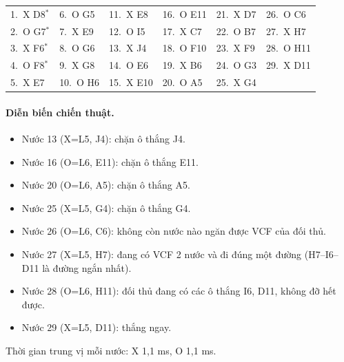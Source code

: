 {\footnotesize\linespread{1}\selectfont
\noindent\begin{tabularx}{\linewidth}{*{6}{X}}
\toprule
1.~X D8$^\ast$ & 6.~O G5 & 11.~X E8 & 16.~O E11 & 21.~X D7 & 26.~O C6 \\
2.~O G7$^\ast$ & 7.~X E9 & 12.~O I5 & 17.~X C7 & 22.~O B7 & 27.~X H7 \\
3.~X F6$^\ast$ & 8.~O G6 & 13.~X J4 & 18.~O F10 & 23.~X F9 & 28.~O H11 \\
4.~O F8$^\ast$ & 9.~X G8 & 14.~O E6 & 19.~X B6 & 24.~O G3 & 29.~X D11 \\
5.~X E7 & 10.~O H6 & 15.~X E10 & 20.~O A5 & 25.~X G4 &  \\
\bottomrule
\end{tabularx}\par}
\paragraph{Diễn biến chiến thuật.}
\begin{itemize}\footnotesize\linespread{1.1}\selectfont
\setlength{\itemsep}{0pt}
  \item Nước 13 (X=L5, J4): chặn ô thắng J4.
  \item Nước 16 (O=L6, E11): chặn ô thắng E11.
  \item Nước 20 (O=L6, A5): chặn ô thắng A5.
  \item Nước 25 (X=L5, G4): chặn ô thắng G4.
  \item Nước 26 (O=L6, C6): không còn nước nào ngăn được VCF của đối thủ.
  \item Nước 27 (X=L5, H7): đang có VCF 2 nước và đi đúng một đường (H7--I6--D11 là đường ngắn nhất).
  \item Nước 28 (O=L6, H11): đối thủ đang có các ô thắng I6, D11, không đỡ hết được.
  \item Nước 29 (X=L5, D11): thắng ngay.
\end{itemize}
Thời gian trung vị mỗi nước: X 1,1 ms, O 1,1 ms.
\clearpage

